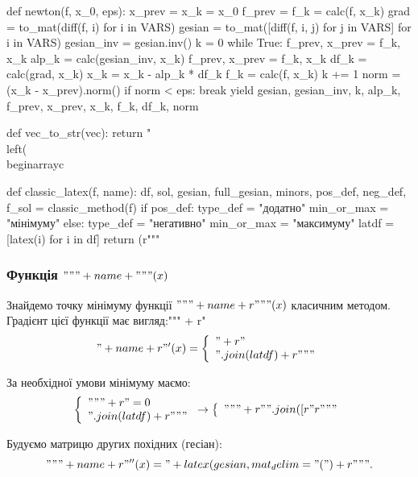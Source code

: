 \documentclass[14pt,a4paper]{extarticle}
\theoremstyle{definition}
\renewcommand{\[}{\begin{dmath*}[compact]}
\renewcommand{\]}{\end{dmath*}}
\begin{document}
\begin{pythoncode}
def newton(f, x_0, eps):
    x_prev = x_k = x_0
    f_prev = f_k = calc(f, x_k)
    grad = to_mat(diff(f, i) for i in VARS)
    gesian = to_mat([diff(f, i, j) for j in VARS] for i in VARS)
    gesian_inv = gesian.inv()
    k = 0
    while True:
        f_prev, x_prev = f_k, x_k
        alp_k = calc(gesian_inv, x_k)
        f_prev, x_prev = f_k, x_k
        df_k = calc(grad, x_k)
        x_k = x_k - alp_k * df_k
        f_k = calc(f, x_k)
        k += 1
        norm = (x_k - x_prev).norm()
        if norm < eps:
            break
        yield gesian, gesian_inv, k, alp_k, f_prev, x_prev, x_k, f_k, df_k, norm

def vec_to_str(vec):
    return "\\left(\\begin{array}{c}%

def classic_latex(f, name):
    df, sol, gesian, full_gesian, minors, pos_def, neg_def, f_sol = classic_method(f)
    if pos_def:
        type_def = "додатно"
        min_or_max = "мінімуму"
    else:
        type_def = "негативно"
        min_or_max = "максимуму"
    latdf = [latex(i) for i in df]
    return (r"""
\subsubsection{Функція $""" + name + """(x)$}

Знайдемо точку мінімуму функції $""" + name + r"""(x)$ класичним методом.
Градієнт цієї функції має вигляд:""" +
    r"\[" + name + r"'(x)=\left\{\begin{array}{l}" + r"\\".join(latdf) + r"""\end{array}\right.\]

За необхідної умови мінімуму маємо:
\[\left\{\begin{array}{l}""" + r"=0\\".join(latdf) + r"""\end{array}\right.\to\left\{\begin{array}{l}""" +
    r"".join([r"%
    r"""\end{array}\right.\]

Будуємо матрицю других похідних (гесіан):
\[""" + name + r"''(x)=" + latex(gesian, mat_delim="(") + r""".\]


\end{pythoncode}
\end{document}
